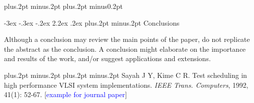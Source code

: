 \documentclass[twoside]{article}
\makeatletter
\def\section{\@startsection{section}{1}{\z@}%
 {-3ex \@plus -.3ex \@minus -.2ex}%
 {2.2ex \@plus.2ex}%
{\normalfont\normalsize\protect\baselineskip=14.5pt plus.2pt minus.2pt\bfseries}}
\makeatother
\begin{document}
\baselineskip=18pt plus.2pt minus.2pt
\parskip=0pt plus.2pt minus0.2pt
\begin{multicols}{2}












\section{ Conclusions}

Although a conclusion may review the main points of the paper, do not replicate the abstract as the conclusion. A conclusion might elaborate on the importance and results of the work, and/or suggest applications and extensions.

\vspace{2mm}

 

\begin{thebibliography}{99}
\footnotesize
\itemsep=-3pt plus.2pt minus.2pt
\baselineskip=13pt plus.2pt minus.2pt
Sayah J Y, Kime C R. Test scheduling in high performance VLSI system implementations. {\it IEEE Trans. Computers}, 1992, 41(1): 52-67.  [\textcolor{blue}{example for journal paper}]


\end{thebibliography}

\label{last-page}
\end{multicols}
\end{document}
